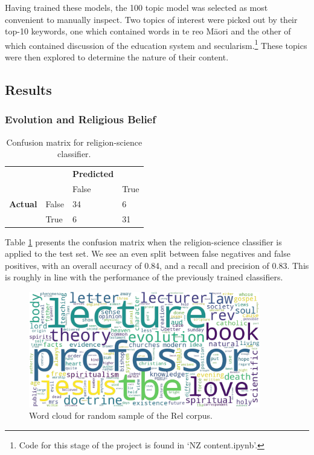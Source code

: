\documentclass{article}
\begin{document}
Having trained these models, the 100 topic model was selected as most convenient to manually inspect. Two topics of interest were picked out by their top-10 keywords, one which contained words in te reo Māori and the other of which contained discussion of the education system and secularism.\footnote{Code for this stage of the project is found in `NZ content.ipynb'.} These topics were then explored to determine the nature of their content.

\subsection{Results}\label{s:2qu-results}

\subsubsection{Evolution and Religious Belief}

\begin{table}[]
  \centering
  \footnotesize
  \begin{tabular}{ll|ll}
  & & \textbf{Predicted} & \\
  & & False & True \\
  \hline
  \textbf{Actual} & False & 34 & 6 \\
  & True & 6 & 31 \\
  \end{tabular}
  \caption{Confusion matrix for religion-science classifier.}
  \label{t:rel-confusion}
\end{table}

Table \ref{t:rel-confusion} presents the confusion matrix when the religion-science classifier is applied to the test set. We see an even split between false negatives and false positives, with an overall accuracy of 0.84, and a recall and precision of 0.83. This is roughly in line with the performance of the previously trained classifiers.

\begin{figure}
  \centering
  \includegraphics[width=0.9\textwidth]{images/rel_v2_philoso_tf-idf.png}
  \caption{Word cloud for random sample of the Rel corpus.}
  \label{f:wc-rel}
\end{figure}
\end{document}
